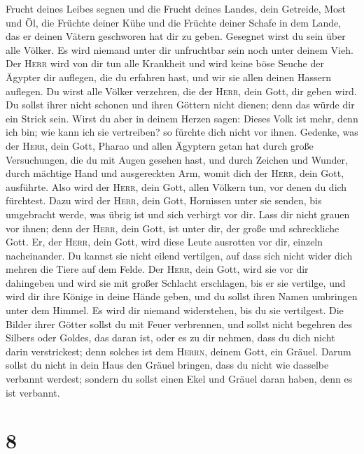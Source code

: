 Frucht deines Leibes segnen und die Frucht deines Landes, dein Getreide,
Most und Öl, die Früchte deiner Kühe und die Früchte deiner Schafe in
dem Lande, das er deinen Vätern geschworen hat dir zu geben.
 Gesegnet wirst du sein über alle Völker. Es wird niemand
unter dir unfruchtbar sein noch unter deinem Vieh.  Der
\textsc{Herr} wird von dir tun alle Krankheit und wird keine böse Seuche
der Ägypter dir auflegen, die du erfahren hast, und wir sie allen deinen
Hassern auflegen.  Du wirst alle Völker verzehren, die
der \textsc{Herr}, dein Gott, dir geben wird. Du sollst ihrer nicht
schonen und ihren Göttern nicht dienen; denn das würde dir ein Strick
sein.  Wirst du aber in deinem Herzen sagen: Dieses Volk
ist mehr, denn ich bin; wie kann ich sie vertreiben?  so
fürchte dich nicht vor ihnen. Gedenke, was der \textsc{Herr}, dein Gott,
Pharao und allen Ägyptern getan hat  durch große
Versuchungen, die du mit Augen gesehen hast, und durch Zeichen und
Wunder, durch mächtige Hand und ausgereckten Arm, womit dich der
\textsc{Herr}, dein Gott, ausführte. Also wird der \textsc{Herr}, dein
Gott, allen Völkern tun, vor denen du dich fürchtest. 
Dazu wird der \textsc{Herr}, dein Gott, Hornissen unter sie senden, bis
umgebracht werde, was übrig ist und sich verbirgt vor dir.
 Lass dir nicht grauen vor ihnen; denn der \textsc{Herr},
dein Gott, ist unter dir, der große und schreckliche Gott.
 Er, der \textsc{Herr}, dein Gott, wird diese Leute
ausrotten vor dir, einzeln nacheinander. Du kannst sie nicht eilend
vertilgen, auf dass sich nicht wider dich mehren die Tiere auf dem
Felde.  Der \textsc{Herr}, dein Gott, wird sie vor dir
dahingeben und wird sie mit großer Schlacht erschlagen, bis er sie
vertilge,  und wird dir ihre Könige in deine Hände geben,
und du sollst ihren Namen umbringen unter dem Himmel. Es wird dir
niemand widerstehen, bis du sie vertilgest.  Die Bilder
ihrer Götter sollst du mit Feuer verbrennen, und sollst nicht begehren
des Silbers oder Goldes, das daran ist, oder es zu dir nehmen, dass du
dich nicht darin verstrickest; denn solches ist dem \textsc{Herrn},
deinem Gott, ein Gräuel.  Darum sollst du nicht in dein
Haus den Gräuel bringen, dass du nicht wie dasselbe verbannt werdest;
sondern du sollst einen Ekel und Gräuel daran haben, denn es ist
verbannt.

\hypertarget{section-7}{%
\section{8}\label{section-7}}

